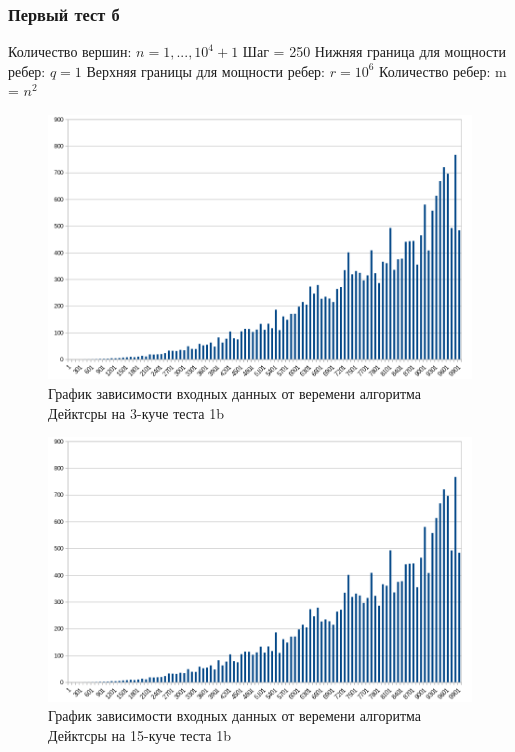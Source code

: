 \documentclass[a4paper, 12pt]{article}
\theoremstyle{definition}
\begin{document}
	\subsubsection{Первый тест б}
	Количество вершин: $n = 1, ... , 10^4+1$ \newline
	Шаг = 250 \newline
	Нижняя граница для мощности ребер: $q = 1$ \newline
	Верхняя границы для мощности ребер: $r = 10^6$ \newline
	Количество ребер: m = $n^2$ \newline
	
	\begin{figure}[!ht]
		\centering
		\includegraphics[width=1\textwidth]{img/res1b_15.png}
		\caption{График зависимости входных данных от веремени алгоритма Дейктсры на 3-куче теста 1b}
		\label{fig:my_image}
	\end{figure}
	
	\begin{figure}[!ht]
		\centering
		\includegraphics[width=1\textwidth]{img/res1b_15.png}
		\caption{График зависимости входных данных от веремени алгоритма Дейктсры на 15-куче теста 1b}
		\label{fig:my_image}
	\end{figure}
	\newpage
	
\end{document}
